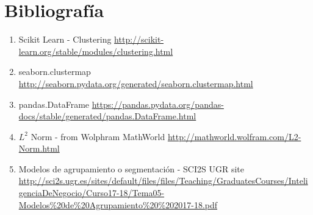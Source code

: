 	\section{Bibliografía}
	\begin{enumerate}
		\item Scikit Learn - Clustering \url{http://scikit-learn.org/stable/modules/clustering.html}
		\item seaborn.clustermap \url{http://seaborn.pydata.org/generated/seaborn.clustermap.html}
		\item pandas.DataFrame \url{https://pandas.pydata.org/pandas-docs/stable/generated/pandas.DataFrame.html}
		\item $L^2$ Norm - from Wolphram MathWorld \url{http://mathworld.wolfram.com/L2-Norm.html}
		\item Modelos de agrupamiento o segmentación - SCI2S UGR site \url{http://sci2s.ugr.es/sites/default/files/files/Teaching/GraduatesCourses/InteligenciaDeNegocio/Curso17-18/Tema05-Modelos\%20de\%20Agrupamiento\%20\%202017-18.pdf}  
	\end{enumerate}
	
